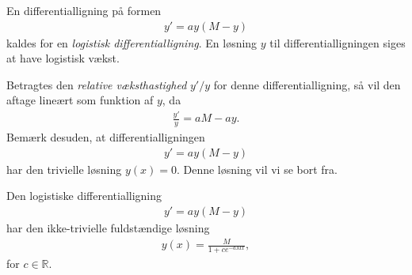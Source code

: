 \begin{defn}
	En differentialligning på formen 
	\begin{align*}
		y' = ay(M-y)
	\end{align*}
	kaldes for en \textit{logistisk differentialligning}. En løsning $y$ til differentialligningen siges at have logistisk vækst. 
\end{defn}
Betragtes den \textit{relative væksthastighed} $y'/y$ for denne differentialligning, så vil den aftage lineært som funktion af $y$, da
\begin{align*}
	\frac{y'}{y} = aM - ay.
\end{align*}
Bemærk desuden, at differentialligningen
\begin{align*}
	y' = ay(M-y)
\end{align*}
har den trivielle løsning $y(x) = 0$. Denne løsning vil vi se bort fra. 
\begin{setn}
	Den logistiske differentialligning
	\begin{align*}
		y' = ay(M-y)
	\end{align*}
	har den ikke-trivielle fuldstændige løsning
	\begin{align*}
		y(x) = \frac{M}{1+ce^{-aMx}},
	\end{align*}
	for $c\in \mathbb{R}$. 
\end{setn}
